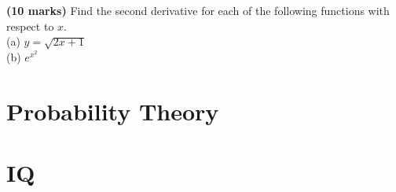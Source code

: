 \documentclass{article}
\begin{document}
\vspace{8\baselineskip}

\noindent \textbf{(10 marks)} Find the second derivative for each of the following functions with respect to $x$.\\
\indent (a) $y=\sqrt{2x+1}$\\
\indent (b) $e^{x^2}$





\section{Probability Theory}



\section{IQ}
\end{document}
